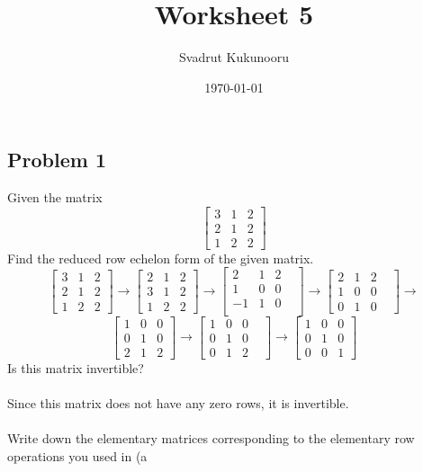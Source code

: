 \documentclass[letterpaper]{report}
\title{Worksheet 5}
\author{Svadrut Kukunooru}
\date{\today}
\begin{document}
\begin{titlepage}
    \maketitle
\end{titlepage}
    \subsection{Problem 1}%
    \label{sub:Problem 1}
    Given the matrix
    \[
    \begin{bmatrix} 
        3 & 1 & 2 \\
        2 & 1 & 2 \\
        1 & 2 & 2
    \end{bmatrix} 
    \] 
    Find the reduced row echelon form of the given matrix. 
\[
\begin{bmatrix} 
    3 & 1 & 2 \\
    2 & 1 & 2 \\
    1 & 2 & 2 
\end{bmatrix} \to
\begin{bmatrix} 
    2 & 1 & 2 \\
    3 & 1 & 2 \\
    1 & 2 & 2 
\end{bmatrix} \to 
\begin{bmatrix} 
    2 & 1 & 2 \\
    1 & 0 & 0 & \\
    -1 & 1 & 0 \\
\end{bmatrix} \to
\begin{bmatrix} 
    2 & 1 & 2 \\
    1 & 0 & 0 & \\
    0 & 1 & 0 
\end{bmatrix}  \to
\] 
\[
\begin{bmatrix} 
    1 & 0 & 0 \\
    0 & 1 & 0 \\
    2 & 1 & 2 
\end{bmatrix} \to 
\begin{bmatrix} 
    1 & 0 & 0 & \\
    0 & 1 & 0 \\
    0 & 1 & 2
\end{bmatrix}  \to
\begin{bmatrix} 
    1 & 0 & 0 \\
    0 & 1 & 0 \\
    0 & 0 & 1 
\end{bmatrix} 
\] 
Is this matrix invertible? \\ \\ 
Since this matrix does not have any zero rows, it is invertible. \\ \\ 

Write down the elementary matrices corresponding to the elementary row operations you used in (a
\end{document}
